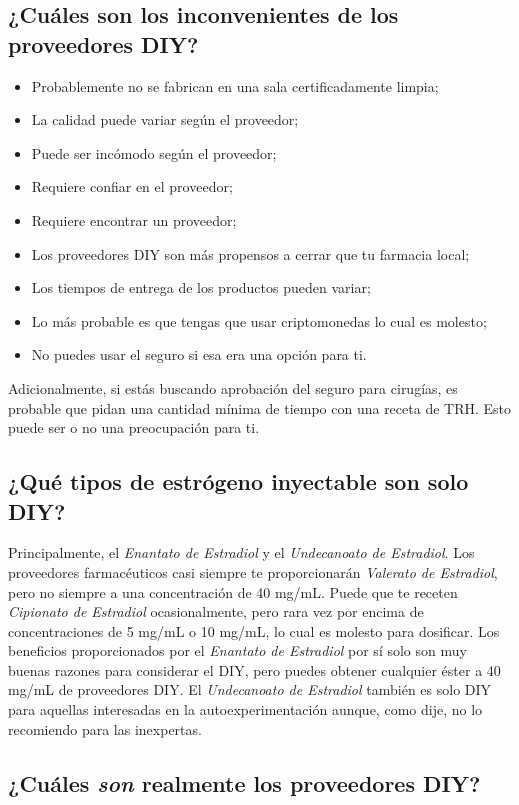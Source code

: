 \documentclass{article}
\begin{document}
\subsection{¿Cuáles son los inconvenientes de los proveedores DIY?}

\begin{itemize}
  \item Probablemente no se fabrican en una sala certificadamente limpia;
  \item La calidad puede variar según el proveedor;
  \item Puede ser incómodo según el proveedor;
  \item Requiere confiar en el proveedor;
  \item Requiere encontrar un proveedor;
  \item Los proveedores DIY son más propensos a cerrar que tu farmacia local;
  \item Los tiempos de entrega de los productos pueden variar;
  \item Lo más probable es que tengas que usar criptomonedas lo cual es molesto;
  \item No puedes usar el seguro si esa era una opción para ti.
\end{itemize}
Adicionalmente, si estás buscando aprobación del seguro para cirugías, es probable que pidan una cantidad mínima de tiempo con una receta de TRH. Esto puede ser o no una preocupación para ti.

\subsection{¿Qué tipos de estrógeno inyectable son solo DIY?}

Principalmente, el \textit{Enantato de Estradiol} y el \textit{Undecanoato de Estradiol}. Los proveedores farmacéuticos casi siempre te proporcionarán \textit{Valerato de Estradiol}, pero no siempre a una concentración de 40 mg/mL. Puede que te receten \textit{Cipionato de Estradiol} ocasionalmente, pero rara vez por encima de concentraciones de 5 mg/mL o 10 mg/mL, lo cual es molesto para dosificar. Los beneficios proporcionados por el \textit{Enantato de Estradiol} por sí solo son muy buenas razones para considerar el DIY, pero puedes obtener cualquier éster a 40 mg/mL de proveedores DIY. El \textit{Undecanoato de Estradiol} también es solo DIY para aquellas interesadas en la autoexperimentación aunque, como dije, no lo recomiendo para las inexpertas.

\subsection{¿Cuáles \textit{son} realmente los proveedores DIY?}
\end{document}
